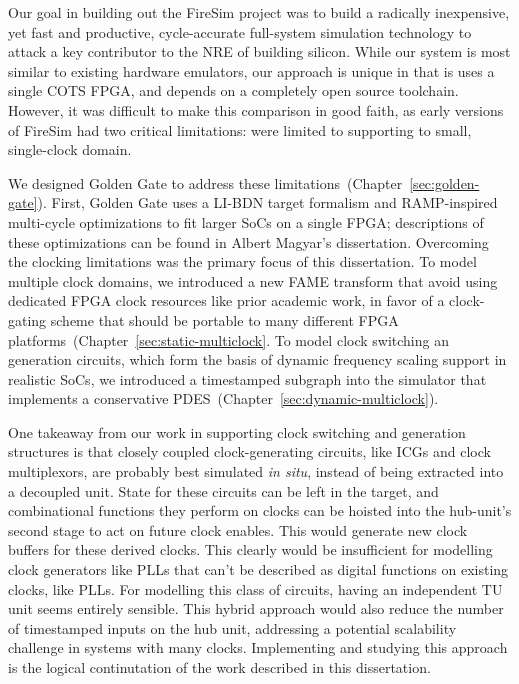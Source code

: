 Our goal in building out the FireSim project was to build a radically
inexpensive, yet fast and productive, cycle-accurate full-system simulation
technology to attack a key contributor to the NRE of building silicon.  While
our system is most similar to existing hardware emulators, our approach is
unique in that is uses a single COTS FPGA, and depends on a completely open
source toolchain. However, it was difficult to make this comparison in good
faith, as early versions of FireSim had two critical limitations: were limited
to supporting to small, single-clock domain.

We designed Golden Gate to address these limitations~(Chapter~\ref{sec:golden-gate}). First, Golden Gate uses a LI-BDN
target formalism and RAMP-inspired multi-cycle optimizations to fit larger SoCs
on a single FPGA; descriptions of these optimizations can be found in Albert
Magyar's dissertation. Overcoming the clocking limitations was the primary focus of this dissertation.
To model multiple clock domains, we introduced a new FAME transform that avoid
using dedicated FPGA clock resources like prior academic work, in favor of a
clock-gating scheme that should be portable to many different FPGA
platforms~(Chapter~\ref{sec:static-multiclock}.  To model clock switching an
generation circuits, which form the basis of dynamic frequency scaling support
in realistic SoCs, we introduced a timestamped subgraph into the simulator that
implements a conservative PDES~(Chapter~\ref{sec:dynamic-multiclock}).

One takeaway from our work in supporting clock switching and generation
structures is that closely coupled clock-generating circuits, like ICGs and
clock multiplexors, are probably best simulated \emph{in situ}, instead of
being extracted into a decoupled unit. State for these circuits can be left in
the target, and combinational functions they perform on clocks can be hoisted
into the hub-unit's second stage to act on future clock enables. This would
generate new clock buffers for these derived clocks. This clearly would be
insufficient for modelling clock generators like PLLs that can't be described
as digital functions on existing clocks, like PLLs.  For modelling this class
of circuits, having an independent TU unit seems entirely sensible.  This
hybrid approach would also reduce the number of timestamped inputs on the hub
unit, addressing a potential scalability challenge in systems with many clocks.
Implementing and studying this approach is the logical continutation of the
work described in this dissertation.

